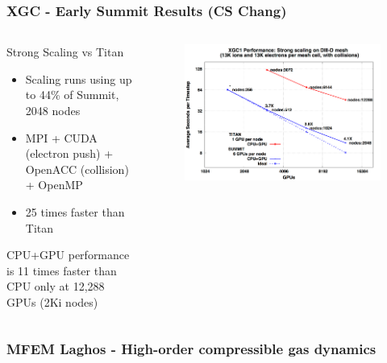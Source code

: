 \documentclass[aspectratio=169]{beamer}
\begin{document}
\begin{frame}
  \frametitle{XGC - Early Summit Results (CS Chang)}
  \begin{columns}
    \begin{column}{0.5\textwidth}
      Strong Scaling vs Titan
      \begin{itemize}
        \item Scaling runs using up to 44\% of Summit, 2048 nodes
        \item MPI + CUDA (electron push) + OpenACC (collision) + OpenMP
        \item 25 times faster than Titan %
      \end{itemize}
      CPU+GPU performance is 11 times faster than CPU only at 12,288 GPUs (2Ki
      nodes)
    \end{column}
    \begin{column}{0.5\textwidth}
      \begin{figure}
        \centering
        \includegraphics[width=\textwidth]{figures/xgcStrongScaling.png}
      \end{figure}
    \end{column}
  \end{columns}
\end{frame}

\begin{frame}
  \frametitle{MFEM Laghos - High-order compressible gas dynamics}
\end{frame}
\end{document}
